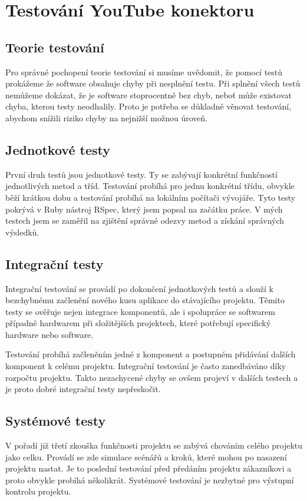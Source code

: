 \section{Testování YouTube konektoru}
\subsection{Teorie testování}
\par Pro správné pochopení teorie testování\cite{si1} si musíme uvědomit, že pomocí testů prokážeme že software obsahuje chyby při nesplnění testu. Při splnění všech testů nemůžeme dokázat, že je software stoprocentně bez chyb, neboť může existovat chyba, kterou testy neodhalily. Proto je potřeba se důkladně věnovat testování, abychom snížili riziko chyby na nejnižší možnou úroveň.
\subsection{Jednotkové testy}
\par První druh testů jsou jednotkové testy\cite{si1}. Ty se zabývají konkrétní funkčností jednotlivých metod a tříd. Testování probíhá pro jednu konkrétní třídu, obvykle běží krátkou dobu a testování probíhá na lokálním počítači vývojáře. Tyto testy pokrývá v Ruby nástroj RSpec, který jsem popsal na začátku práce. V mých testech jsem se zaměřil na zjištění správné odezvy metod a získání správných výsledků.
\subsection{Integrační testy}
\par Integrační testování\cite{si1} se provádí po dokončení jednotkových testů a slouží k bezchybnému začlenění nového kusu aplikace do stávajícího projektu. Těmito testy se ověřuje nejen integrace komponentů, ale i spolupráce se softwarem případně hardwarem při složitějších projektech, které potřebují specifický hardware nebo software. 
\par Testování probíhá začleněním jedné z komponent a postupném přidávání dalších komponent k celému projektu. Integrační testování je často zanedbáváno díky rozpočtu projektu. Takto nezachycené chyby se ovšem projeví v dalších testech a je proto dobré integrační testy nepřeskočit.
\subsection{Systémové testy}
\par V pořadí již třetí zkouška funkčnosti projektu se zabývá chováním celého projektu jako celku. Provádí se zde simulace scénářů a kroků, které mohou po nasazení projektu nastat. Je to poslední testování před předáním projektu zákazníkovi a proto obvykle probíhá několikrát. Systémové testování\cite{si1} je nezbytné pro výstupní kontrolu projektu.
